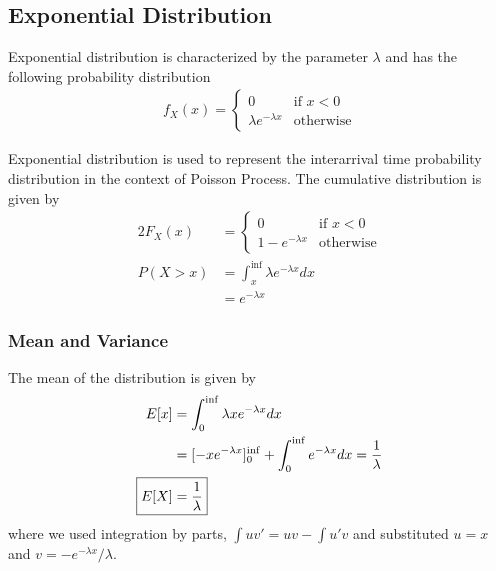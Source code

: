 \documentclass[../../probability-notes.tex]{subfiles}
\begin{document}
    \subsection{Exponential Distribution}
    Exponential distribution is characterized by the parameter $\lambda$ and has the following probability distribution
    \begin{align*}
        f_{X}(x) = \begin{cases} 0 &\mbox{if $x < 0$}\\
                                \lambda e^{-\lambda x} &\mbox{otherwise} \end{cases}
    \end{align*}

    Exponential distribution is used to represent the interarrival time probability distribution in the context of Poisson Process. The cumulative distribution is given by
    \begin{alignat*}{2}
        F_{X}(x) &= \begin{cases} 0 &\mbox{if $x < 0$}\\
                                1 - e^{-\lambda x} &\mbox{otherwise} \end{cases}\\
        P(X > x) &= \int_{x}^{\inf} \lambda e^{-\lambda x} dx\\
        &= e^{-\lambda x}
    \end{alignat*}

    \subsubsection{Mean and Variance}
    The mean of the distribution is given by
    \begin{align*}
        E[x] &= \int_{0}^{\inf} \lambda x e^{-\lambda x} dx\\
        &= [-x e^{-\lambda x}]_{0}^{\inf} + \int_{0}^{\inf} e^{-\lambda x} dx = \frac{1}{\lambda}\\
        \Aboxed{E[X] &= \frac{1}{\lambda}}
    \end{align*}
    where we used integration by parts, $\int uv' = uv - \int u'v$ and substituted $u = x$ and $v = -e^{-\lambda x}/\lambda$.\newline
\end{document}
